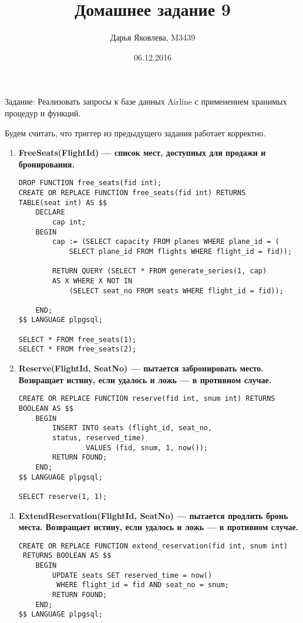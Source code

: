 \documentclass[12pt]{article}
\title{Домашнее задание 9}
\author{Дарья Яковлева, M3439}
\date{06.12.2016}
\begin{document}
\maketitle
\thispagestyle{empty}

Задание:  Реализовать запросы к базе данных Airline с применением хранимых процедур и функций.

Будем считать, что триггер из предыдущего задания работает корректно.

\begin{enumerate}	

          \item \textbf{ FreeSeats(FlightId) — список мест, доступных для продажи и бронирования.}

          \begin{lstlisting} 
DROP FUNCTION free_seats(fid int);
CREATE OR REPLACE FUNCTION free_seats(fid int) RETURNS 
TABLE(seat int) AS $$
	DECLARE
		cap int;
	BEGIN
    	cap := (SELECT capacity FROM planes WHERE plane_id = (
	    	SELECT plane_id FROM flights WHERE flight_id = fid));

	    RETURN QUERY (SELECT * FROM generate_series(1, cap) 
	    AS X WHERE X NOT IN 
    		(SELECT seat_no FROM seats WHERE flight_id = fid));

    END;
$$ LANGUAGE plpgsql;

SELECT * FROM free_seats(1);
SELECT * FROM free_seats(2);

           \end{lstlisting} 

          \item \textbf{ Reserve(FlightId, SeatNo) — пытается забронировать место. Возвращает истину, если удалось и ложь — в противном случае.}

          \begin{lstlisting} 
CREATE OR REPLACE FUNCTION reserve(fid int, snum int) RETURNS BOOLEAN AS $$
    BEGIN
	   	INSERT INTO seats (flight_id, seat_no, 
	   	status, reserved_time)
				VALUES (fid, snum, 1, now());
		RETURN FOUND;
    END;
$$ LANGUAGE plpgsql;

SELECT reserve(1, 1);
           \end{lstlisting} 
                    
          \item \textbf{ExtendReservation(FlightId, SeatNo) — пытается продлить бронь места. Возвращает истину, если удалось и ложь — в противном случае.}

          \begin{lstlisting} 
CREATE OR REPLACE FUNCTION extend_reservation(fid int, snum int)
 RETURNS BOOLEAN AS $$
    BEGIN
		UPDATE seats SET reserved_time = now()
		 WHERE flight_id = fid AND seat_no = snum;
	    RETURN FOUND;
    END;
$$ LANGUAGE plpgsql;


\end{lstlisting}
\end{enumerate}
\end{document}
